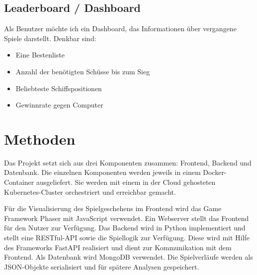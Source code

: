 \documentclass[a4paper, 10pt, conference]{IEEEtran}
\begin{document}
\subsection{Leaderboard / Dashboard}
Als Benutzer möchte ich ein Dashboard, das Informationen über vergangene Spiele darstellt. Denkbar sind:
\begin{itemize}
	\item Eine Bestenliste
	\item Anzahl der benötigten Schüsse bis zum Sieg
	\item Beliebteste Schiffspositionen
	\item Gewinnrate gegen Computer
\end{itemize}


\section{Methoden}\label{sec:methoden}

Das Projekt setzt sich aus drei Komponenten zusammen: Frontend, Backend und Datenbank.
Die einzelnen Komponenten werden jeweils in einem Docker-Container ausgeliefert.
Sie werden mit einem in der Cloud gehosteten Kubernetes-Cluster orchestriert und erreichbar gemacht.

Für die Visualisierung des Spielgeschehens im Frontend wird das Game Framework Phaser mit JavaScript verwendet. 
Ein Webserver stellt das Frontend für den Nutzer zur Verfügung.
Das Backend wird in Python implementiert und stellt eine RESTful-API sowie die Spiellogik zur Verfügung.
Diese wird mit Hilfe des Frameworks FastAPI realisiert und dient zur Kommunikation mit dem Frontend.
Als Datenbank wird MongoDB verwendet. Die Spielverläufe werden als JSON-Objekte serialisiert und für spätere Analysen gespeichert.

\printbibliography
\end{document}
